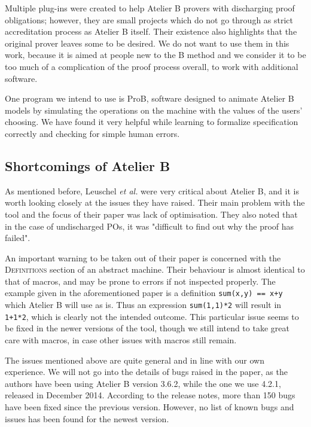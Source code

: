 \documentclass[12pt,journal,duplex]{IEEEtran}
\begin{document}
	Multiple plug-ins were created to help Atelier B provers with discharging proof obligations; however, they are small projects which do not go through as strict accreditation process as Atelier B itself. Their existence also highlights that the original prover leaves some to be desired. We do not want to use them in this work, because it is aimed at people new to the B method and we consider it to be too much of a complication of the proof process overall, to work with additional software.\cite{SMT}\cite{BEval}\cite{BWare}

	One program we intend to use is ProB, software designed to animate Atelier B models by simulating the operations on the machine with the values of the users' choosing. We have found it very helpful while learning to formalize specification correctly and checking for simple human errors.\cite{proB}
	\subsection{Shortcomings of Atelier B}

	As mentioned before, Leuschel \emph{et al.} were very critical about Atelier B, and it is worth looking closely at the issues they have raised. Their main problem with the tool and the focus of their paper was lack of optimisation. They also noted that in the case of undischarged POs, it was "difficult to find out why the proof has failed".

	An important warning to be taken out of their paper is concerned with the \textsc{Definitions} section of an abstract machine. Their behaviour is almost identical to that of macros, and may be prone to errors if not inspected properly. The example given in the aforementioned paper is a definition \texttt{sum(x,y) == x+y} which Atelier B will use as is. Thus an expression \texttt{sum(1,1)*2} will result in \texttt{1+1*2}, which is clearly not the intended outcome. This particular issue seems to be fixed in the newer versions of the tool, though we still intend to take great care with macros, in case other issues with macros still remain.

	The issues mentioned above are quite general and in line with our own experience. We will not go into the details of bugs raised in the paper, as the authors have been using Atelier B version 3.6.2, while the one we use 4.2.1, released in December 2014. According to the release notes, more than 150 bugs have been fixed since the previous version. However, no list of known bugs and issues has been found for the newest version\cite{release notes}.
\end{document}
